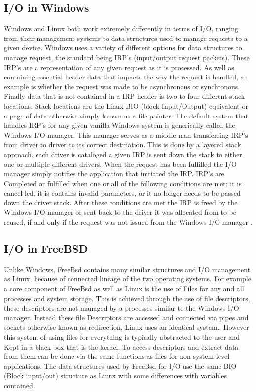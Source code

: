 \subsection{I/O in Windows}
Windows and Linux both work extremely differently in terms of I/O, ranging from their management systems to data structures used to manage requests to a given device. Windows uses a variety of different options for data structures to manage request, the standard being IRP's (input/output request packets)\cite{Understa77:online}. These IRP's are a representation of any given request as it is processed. As well as containing essential header data that impacts the way the request is handled, an example is whether the request was made to be asynchronous or synchronous. Finally data that is not contained in a IRP header is two to four different stack locations\cite{Understa77:online}. Stack locations are the Linux BIO (block Input/Output) equivalent or a page of data otherwise simply known as a file pointer. The default system that handles IRP's for any given vanilla Windows system is generically called the Windows I/O manager. This manager serves as a  middle man transferring IRP's from driver to driver to its correct destination. This is done by a layered stack approach, each driver is cataloged a given IRP is sent down the stack to either one or multiple different drivers. When the request has been fulfilled the I/O manager simply notifies the application that initiated the IRP. IRP's are Completed or fulfilled when one or all of the following conditions are met: it is cancel led, it is contains invalid parameters, or it no longer needs to be passed down the driver stack\cite{WhentoCo44:online}. After these conditions are met the IRP is freed by the Windows I/O manager or sent back to the driver it was allocated from to be reused, if and only if the request was not issued from the Windows I/O manager \cite{ReusingI59:online}.
\subsection{I/O in FreeBSD}
Unlike Windows, FreeBsd contains many similar structures and I/O management as Linux, because of connected lineage of the two operating systems. For example a core component of FreeBsd as well as Linux is the use of Files for any and all processes and system storage. This is achieved through the use of file descriptors, these descriptors are not managed by a processes similar to the Windows I/O manager. Instead these file Descriptors are accessed and connected via pipes and sockets otherwise known as redirection, Linux uses an identical system.\cite{freeBsdBook}. However this system of using files for everything is typically abstracted to the user and Kept in a black box that is the kernel. To access descriptors and extract data from them can be done via the same functions as files for non system level applications. The data structures used by FreeBsd for I/O use the same BIO (Block input/out) structure as Linux with some differences with variables contained\cite{kong_2012}.
